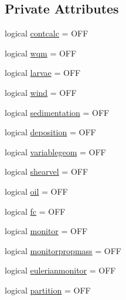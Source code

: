 \subsection*{Private Attributes}
\begin{DoxyCompactItemize}
\item 
logical \mbox{\hyperlink{structmodulelagrangianglobal_1_1t__state_afa6909ae3d43417036e646d71fdf4c73}{contcalc}} = O\+FF
\item 
logical \mbox{\hyperlink{structmodulelagrangianglobal_1_1t__state_a46358f37a63b202c6c29ead055040603}{wqm}} = O\+FF
\item 
logical \mbox{\hyperlink{structmodulelagrangianglobal_1_1t__state_ad4fa12ec51c8c8f44e2b8d974abd0abc}{larvae}} = O\+FF
\item 
logical \mbox{\hyperlink{structmodulelagrangianglobal_1_1t__state_ad406a34f7a9b0aa3fedcca6f801d33d8}{wind}} = O\+FF
\item 
logical \mbox{\hyperlink{structmodulelagrangianglobal_1_1t__state_ac2188b06950c1189bde80a4dc83a34d5}{sedimentation}} = O\+FF
\item 
logical \mbox{\hyperlink{structmodulelagrangianglobal_1_1t__state_a33c7222dfb5665253ea17b481454d96f}{deposition}} = O\+FF
\item 
logical \mbox{\hyperlink{structmodulelagrangianglobal_1_1t__state_af87a98ac1358ceb7aa15c03dd8ddf433}{variablegeom}} = O\+FF
\item 
logical \mbox{\hyperlink{structmodulelagrangianglobal_1_1t__state_aee028af2b2e5f905ef7784d369919199}{shearvel}} = O\+FF
\item 
logical \mbox{\hyperlink{structmodulelagrangianglobal_1_1t__state_a45c47d664c85ceaa42be6b1845c09e62}{oil}} = O\+FF
\item 
logical \mbox{\hyperlink{structmodulelagrangianglobal_1_1t__state_ad0afd09b74ad7ceeb475ebf2c0998be5}{fc}} = O\+FF
\item 
logical \mbox{\hyperlink{structmodulelagrangianglobal_1_1t__state_aafb52342d1ca781359198a8dc0cb2d80}{monitor}} = O\+FF
\item 
logical \mbox{\hyperlink{structmodulelagrangianglobal_1_1t__state_aaee7b945d919ad790053d36052caf65d}{monitorpropmass}} = O\+FF
\item 
logical \mbox{\hyperlink{structmodulelagrangianglobal_1_1t__state_a01ea466f213c68e8b261be71e0d62cc4}{eulerianmonitor}} = O\+FF
\item 
logical \mbox{\hyperlink{structmodulelagrangianglobal_1_1t__state_af2d00f380d200820fa9baeac1ebe0c58}{partition}} = O\+FF

\end{DoxyCompactItemize}
